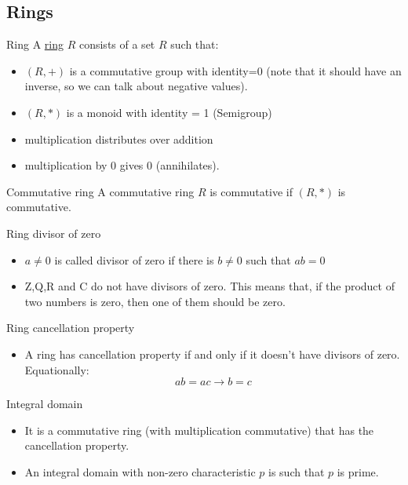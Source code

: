 \documentclass[presentation]{beamer}
\begin{document}
\subsection{Rings}
\label{sec:org1e90116}
\begin{frame}[label={sec:org43dce14}]{Ring}
A \href{https://en.wikipedia.org/wiki/Ring\_(mathematics)}{ring} \(R\) consists of a set \(R\) such that:

\begin{itemize}
\item \((R, +)\) is a \alert{commutative} \alert{group} with identity=0 (note that it should have
an inverse, so we can talk about \alert{negative} values).
\item \((R, *)\) is a monoid with identity = 1 (Semigroup)
\item multiplication distributes over addition
\item multiplication by 0 gives 0 (annihilates).
\end{itemize}
\end{frame}

\begin{frame}[label={sec:orgc01d7b3}]{Commutative ring}
A commutative ring \(R\) is commutative if \((R, *)\) is commutative.
\end{frame}

\begin{frame}[label={sec:org46c990b}]{Ring divisor of zero}
\begin{itemize}
\item \(a \neq 0\) is called divisor of zero if there is \(b \neq 0\) such that \(ab = 0\)

\item Z,Q,R and C do not have divisors of zero. This means that, if the product
of two numbers is zero, then one of them should be zero.
\end{itemize}
\end{frame}

\begin{frame}[label={sec:org8bcad5e}]{Ring cancellation property}
\begin{itemize}
\item A ring has cancellation property if and only if it doesn't have divisors
of zero. Equationally: $$ ab = ac
      \rightarrow b = c $$
\end{itemize}
\end{frame}

\begin{frame}[label={sec:org2bafc68}]{Integral domain}
\begin{itemize}
\item It is a commutative ring (with multiplication commutative) that has the
cancellation property.

\item An integral domain with non-zero characteristic \(p\) is such that \(p\) is prime.
\end{itemize}
\end{frame}
\end{document}
